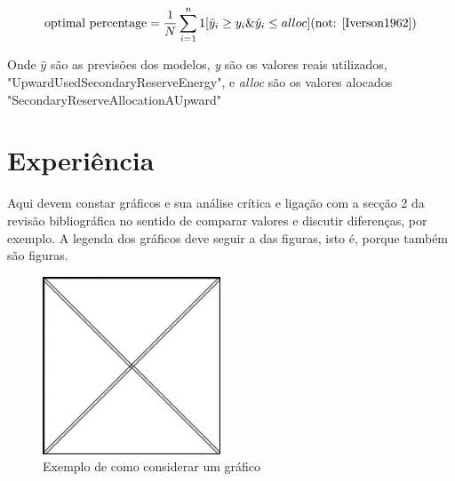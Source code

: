 \begin{equation} 
    \label{eq:eq1} 
    \text{optimal percentage} = \frac{1}{N} \sum_{i=1}^{n} 1 [\hat{y}_i \geq y_i  \&  \hat{y}_i \leq alloc]
    \text{(not: \cite{Iverson1962})}
\end{equation}


Onde \textit{$\hat{y}$} são as previsões dos modelos, \textit{y} são os valores reais utilizados, "UpwardUsedSecondaryReserveEnergy", e \textit{alloc} são os valores alocados "SecondaryReserveAllocationAUpward"


\section{Experiência  \label{se:metricas}}


Aqui devem constar gráficos e sua análise crítica e ligação com a secção 2 da revisão bibliográfica no sentido de comparar valores e discutir diferenças, por exemplo. A legenda dos gráficos deve seguir a das figuras, isto é, porque também são figuras.

\begin{figure}[H]
\centering
\includegraphics[width=150pt, keepaspectratio]{Imagens/FigA.png}
\caption{Exemplo de como considerar um gráfico}
\label{fig:grafico1} %
\end{figure}
